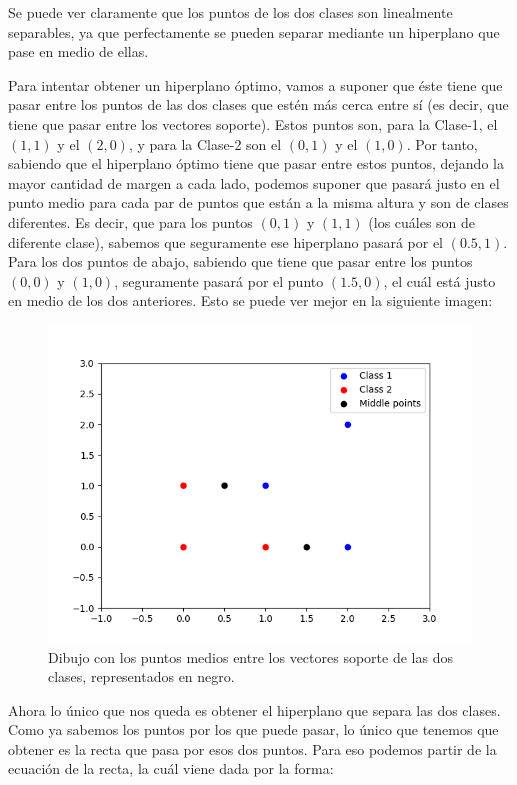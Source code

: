 \documentclass[11pt,a4paper]{article}
\begin{document}
Se puede ver claramente que los puntos de los dos clases son linealmente separables, ya que perfectamente se pueden separar mediante
un hiperplano que pase en medio de ellas.

Para intentar obtener un hiperplano óptimo, vamos a suponer que éste tiene que pasar entre los puntos de las dos clases que estén más
cerca entre sí (es decir, que tiene que pasar entre los vectores soporte). Estos puntos son, para la Clase-1, el $(1, 1)$ y el
$(2, 0)$, y para la Clase-2 son el $(0,1)$ y el $(1, 0)$. Por tanto, sabiendo que el hiperplano óptimo tiene que pasar entre estos
puntos, dejando la mayor cantidad de margen a cada lado, podemos suponer que pasará justo en el punto medio para cada par de puntos
que están a la misma altura y son de clases diferentes. Es decir, que para los puntos $(0, 1)$ y $(1, 1)$ (los cuáles son de
diferente clase), sabemos que seguramente ese hiperplano pasará por el $(0.5, 1)$. Para los dos puntos de abajo, sabiendo que tiene
que pasar entre los puntos $(0, 0)$ y $(1, 0)$, seguramente pasará por el punto $(1.5, 0)$, el cuál está justo en medio de los
dos anteriores. Esto se puede ver mejor en la siguiente imagen:

\begin{figure}[H]
\centering
\includegraphics[scale=0.6]{img/middle.png}
\caption{Dibujo con los puntos medios entre los vectores soporte de las dos clases, representados en negro.}
\end{figure}

Ahora lo único que nos queda es obtener el hiperplano que separa las dos clases. Como ya sabemos los puntos por los que puede pasar,
lo único que tenemos que obtener es la recta que pasa por esos dos puntos. Para eso podemos partir de la ecuación de la recta, la cuál
viene dada por la forma:
\end{document}
